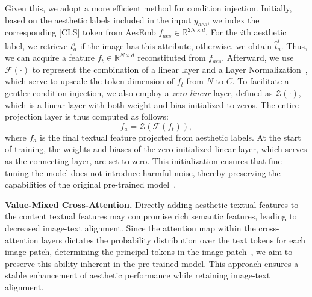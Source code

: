 Given this, we adopt a more efficient method for condition injection. Initially, based on the aesthetic labels included in the input $y_{aes}$, we index the corresponding [CLS] token from AesEmb $f_{aes} \in \mathbb{R}^{2N \times d}$. For the $i$th aesthetic label, we retrieve $t_{a}^i$ if the image has this attribute, otherwise, we obtain $\hat{t}_a^i$. Thus, we can acquire a feature $f_t \in \mathbb{R}^{N \times d}$ reconstituted from $f_{aes}$. Afterward, we use $\mathcal{F}(\cdot)$ to represent the combination of a linear layer and a Layer Normalization~\cite{ba2016layer}, which serve to upscale the token dimension of $f_t$ from $N$ to $C$. To facilitate a gentler condition injection, we also employ a \textit{zero linear} layer, defined as $\mathcal{Z}(\cdot)$, which is a linear layer with both weight and bias initialized to zeros. The entire projection layer is thus computed as follows:
\begin{equation}
f_a=\mathcal{Z}(\mathcal{F}(f_t)),\label{eq7}
\end{equation}
where $f_a$ is the final textual feature projected from aesthetic labels. 
At the start of training, the weights and biases of the zero-initialized linear layer, which serves as the connecting layer, are set to zero. This initialization ensures that fine-tuning the model does not introduce harmful noise, thereby preserving the capabilities of the original pre-trained model~\cite{zhang2023adding}.

\noindent \textbf{Value-Mixed Cross-Attention.} Directly adding aesthetic textual features to the content textual features may compromise rich semantic features, leading to decreased image-text alignment. Since the attention map within the cross-attention layers dictates the probability distribution over the text tokens for each image patch, determining the principal tokens in the image patch~\cite{chefer2023attend}, we aim to preserve this ability inherent in the pre-trained model. This approach ensures a stable enhancement of aesthetic performance while retaining image-text alignment.

